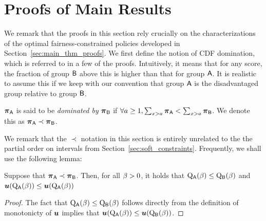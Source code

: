 

\section{Proofs of Main Results\label{app:main_results_proofs}}
We remark that the proofs in this section rely crucially on the characterizations of the optimal fairness-constrained policies developed in Section~\ref{sec:main_thm_proofs}.
We first define the notion of CDF domination, which is referred to in a few of the proofs. Intuitively, it means that for any score, the fraction of group $\mathsf{B}$ above this is higher than that for group $\mathsf{A}$. It is realistic to assume this if we keep with our convention that group $\mathsf{A}$ is the disadvantaged group relative to group $\mathsf{B}$.
\begin{defn}
	$\boldsymbol{\pi}_{\mathsf{A}}$ is said to be \emph{dominated by} $\boldsymbol{\pi}_{\mathsf{B}}$ if $\forall a \ge 1, \sum_{x>a}\boldsymbol{\pi}_{\mathsf{A}} < \sum_{x>a}\boldsymbol{\pi}_{\mathsf{B}}$. We denote this as $\boldsymbol{\pi}_{\mathsf{A}} \prec \boldsymbol{\pi}_{\mathsf{B}}$.
\end{defn}
We remark that the $\prec$ notation in this section is entirely unrelated to the the partial order on intervals from Section~\ref{sec:soft_constraints}. Frequently, we shall use the following lemma:
\begin{lem} Suppose that $\boldsymbol{\pi}_{\mathsf{A}} \prec \boldsymbol{\pi}_{\mathsf{B}}$. Then, for all $\beta > 0$, it holds that $\mathrm{Q}_{\mathsf{A}}(\beta) \le \mathrm{Q}_{\mathsf{B}}(\beta)$ and $\boldsymbol{u}(\mathrm{Q}_{\mathsf{A}}(\beta)) \le \boldsymbol{u}(\mathrm{Q}_{\mathsf{A}}(\beta))$
\end{lem}
\begin{proof}
The fact that $\mathrm{Q}_{\mathsf{A}}(\beta) \le \mathrm{Q}_{\mathsf{B}}(\beta)$ follows directly from the definition of monotonicty of $\boldsymbol{u}$ implies that $\boldsymbol{u}(\mathrm{Q}_{\mathsf{A}}(\beta)) \le \boldsymbol{u}(\mathrm{Q}_{\mathsf{B}}(\beta))$. 
\end{proof}

